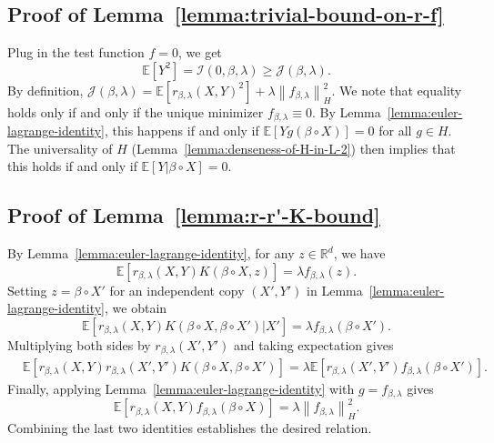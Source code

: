 \documentclass[sn-mathphys-num]{sn-jnl}%
\numberwithin{equation}{section}
\newcommand{\R}{\mathbb{R}}
\newcommand{\E}{\mathbb{E}}
\newcommand{\kernel}{K}
\newcommand{\norm}[1]{\left\|{#1}\right\|} %
\theoremstyle{thmstyleone}%
\theoremstyle{thmstyletwo}%
\theoremstyle{thmstylethree}%
\begin{document}
\subsection{Proof of Lemma~\ref{lemma:trivial-bound-on-r-f}}
\label{sec:proof-of-trivial-bound-on-r-f}
Plug in the test function $f=0$, we get 
\begin{equation*}
	\E[Y^2] = \mathcal{I}(0, \beta, \lambda) \ge \mathcal{J}(\beta, \lambda).
\end{equation*} 
By definition, $\mathcal{J}(\beta, \lambda) = \E[r_{\beta, \lambda}(X, Y)^2] + \lambda \norm{f_{\beta, \lambda}}_H^2$. We note that equality holds only if and only if the unique minimizer $f_{\beta, \lambda} \equiv 0$. By Lemma~\ref{lemma:euler-lagrange-identity}, this happens if and only if $\E[Yg(\beta\circ X)] =0$ for all $g \in H$. The universality of $H$ (Lemma~\ref{lemma:denseness-of-H-in-L-2}) then implies that this holds if and only if $\E[Y | \beta \circ X] = 0$.


\subsection{Proof of Lemma~\ref{lemma:r-r'-K-bound}}
\label{sec:proof-of-lemma-r-r'-K-bound}
By Lemma~\ref{lemma:euler-lagrange-identity}, for any $z \in \R^d$, we have
\begin{equation*}
	\E[r_{\beta, \lambda}(X, Y) \kernel(\beta \circ X, z)] = \lambda f_{\beta, \lambda}(z).
\end{equation*}
Setting $z = \beta \circ X'$ for an independent copy $(X', Y')$ in Lemma~\ref{lemma:euler-lagrange-identity}, we obtain
\begin{equation*}
	\E[r_{\beta, \lambda}(X, Y) \kernel(\beta \circ X, \beta \circ X')|X'] = \lambda f_{\beta, \lambda}(\beta \circ X').
\end{equation*}
Multiplying both sides by $r_{\beta, \lambda}(X', Y')$ and taking expectation gives
\begin{equation*}
\begin{split} 
	&\E\left[r_{\beta, \lambda}(X, Y) r_{\beta, \lambda}(X', Y') \kernel(\beta \circ X, \beta \circ X')\right]
		= \lambda \E[ r_{\beta, \lambda}(X', Y') f_{\beta, \lambda}(\beta \circ X') ].
\end{split}
\end{equation*}
Finally, applying Lemma~\ref{lemma:euler-lagrange-identity} with $g = f_{\beta, \lambda}$ gives
\begin{equation*}
	\E[r_{\beta, \lambda}(X, Y) f_{\beta, \lambda}(\beta \circ X)] = \lambda \norm{f_{\beta, \lambda}}_H^2.
\end{equation*}
Combining the last two identities establishes the desired relation.
\end{document}
